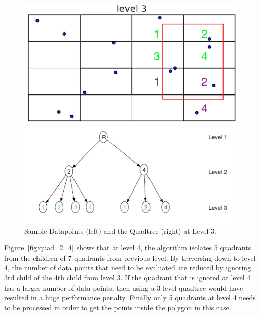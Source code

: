 \begin{figure}[H]
  \centering
  \vspace{0.5in}
  \begin{minipage}[b]{0.35\textwidth}
    \includegraphics[width=\textwidth]{Images/2Quad_3}
  \end{minipage}
  \hfill
  \begin{minipage}[b]{0.6\textwidth}
    \includegraphics[width=\textwidth]{Images/2Quad_3_tree}
  \end{minipage}
  \vspace{0.5in}
  \caption{Sample Datapoints (left) and the Quadtree (right) at Level 3.}
  \label{fig:quad_2_3}
\end{figure}

Figure~\ref{fig:quad_2_4} shows that at level 4, the algorithm isolates 5 quadrants from the children of 7 quadrants from previous level. By traversing down to level 4, the number of data points that need to be evaluated are reduced by ignoring 3rd child of the 4th child from level 3. If the quadrant that is ignored at level 4 has a larger number of data points, then using a 3-level quadtree would have resulted in a huge performance penalty.
Finally only 5 quadrants at level 4 needs to be processed in order to get the points inside the polygon in this case.

